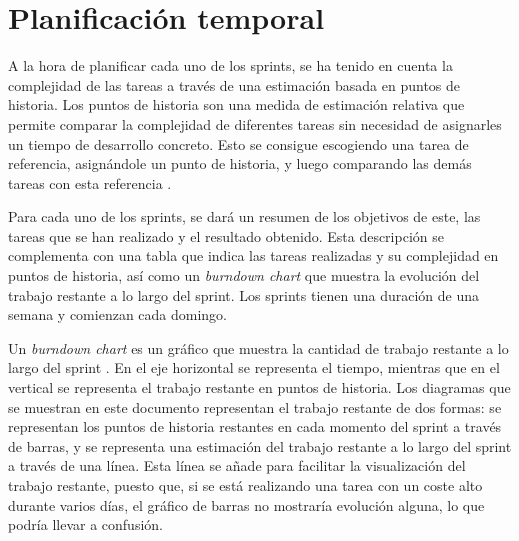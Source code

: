 \chapter{Planificación temporal}
\label{anexo3:cap:planificacion}
A la hora de planificar cada uno de los sprints, se ha tenido en cuenta la complejidad de las tareas
a través de una estimación basada en puntos de historia. Los puntos de historia son una medida de
estimación relativa que permite comparar la complejidad de diferentes tareas sin necesidad de asignarles
un tiempo de desarrollo concreto. Esto se consigue escogiendo una tarea de referencia, asignándole
un punto de historia, y luego comparando las demás tareas con esta referencia \parencite{MariaMedicion}.

Para cada uno de los sprints, se dará un resumen de los objetivos de este, las tareas que se han
realizado y el resultado obtenido. Esta descripción se complementa con una tabla que indica las tareas
realizadas y su complejidad en puntos de historia, así como un \textit{burndown chart} que muestra la
evolución del trabajo restante a lo largo del sprint. Los sprints tienen una duración de una semana y
comienzan cada domingo\footnotemark.


Un \textit{burndown chart} es un gráfico que muestra la cantidad de trabajo restante a lo largo del
sprint \parencite{PMBOK7}. En el eje horizontal se representa el tiempo, mientras que en el vertical
se representa el trabajo restante en puntos de historia. Los diagramas que se muestran en este
documento representan el trabajo restante de dos formas: se representan los puntos de historia
restantes en cada momento del sprint a través de barras, y se representa una estimación del trabajo
restante a lo largo del sprint a través de una línea. Esta línea se añade para facilitar la
visualización del trabajo restante, puesto que, si se está realizando una tarea con un coste
alto durante varios días, el gráfico de barras no mostraría evolución alguna, lo que podría
llevar a confusión.


